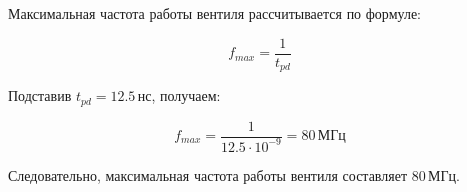Максимальная частота работы вентиля рассчитывается по формуле:

\[
	f_{max} = \frac{1}{t_{pd}}
\]

Подставив \( t_{pd} = 12.5 \, \text{нс} \), получаем:

\[
	f_{max} = \frac{1}{12.5 \cdot 10^{-9}} = 80 \, \text{МГц}
\]

Следовательно, максимальная частота работы вентиля составляет \( 80 \, \text{МГц} \).
